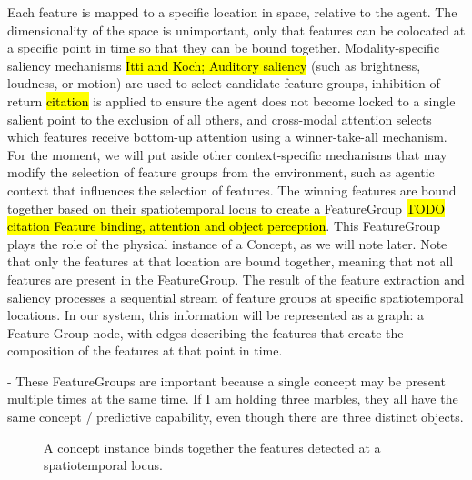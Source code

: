 \documentclass{article}
\begin{document}
Each feature is mapped to a specific location in space, relative to the agent. The dimensionality of the space is unimportant, only that features can be colocated at a specific point in time so that they can be bound together. Modality-specific saliency mechanisms \hl{Itti and Koch; Auditory saliency} (such as brightness, loudness, or motion) are used to select candidate feature groups, inhibition of return \hl{citation} is applied to ensure the agent does not become locked to a single salient point to the exclusion of all others, and cross-modal attention selects which features receive bottom-up attention using a winner-take-all mechanism. For the moment, we will put aside other context-specific mechanisms that may modify the selection of feature groups from the environment, such as agentic context that influences the selection of features. The winning features are bound together based on their spatiotemporal locus to create a FeatureGroup \citep{Kahneman_Treisman_Gibbs_1992, pylyshyn_role_1989, Wolfe_2021, treisman_binding_1996} \hl {TODO citation Feature binding, attention and object perception}. This FeatureGroup plays the role of the physical instance of a Concept, as we will note later. Note that only the features at that location are bound together, meaning that not all features are present in the FeatureGroup. The result of the feature extraction and saliency processes a sequential stream of feature groups at specific spatiotemporal locations. In our system, this information will be represented as a graph: a Feature Group node, with edges describing the features that create the composition of the features at that point in time.

- These FeatureGroups are important because a single concept may be present multiple times at the same time. If I am holding three marbles, they all have the same concept / predictive capability, even though there are three distinct objects.

\begin{figure}[ht]
  \centering
  \caption{A concept instance binds together the features detected at a spatiotemporal locus.}
  \label{fig:concept-instance}
\end{figure}
\end{document}

